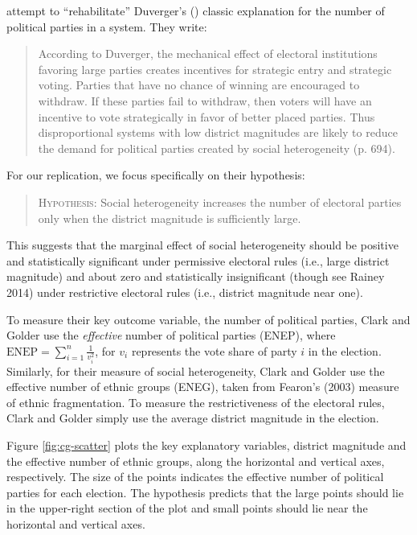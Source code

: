 \documentclass[12pt]{article}
\begin{document}
\cite{ClarkGolder2006} attempt to ``rehabilitate'' Duverger's (\citeyear{Duverger1963}) classic explanation for the number of political parties in a system.
They write: 

\begin{quote}
According to Duverger, the mechanical effect of electoral institutions favoring large parties creates incentives for strategic entry and strategic voting. 
Parties that have no chance of winning are encouraged to withdraw. 
If these parties fail to withdraw, then voters will have an incentive to vote strategically in favor of better placed parties. 
Thus disproportional systems with low district magnitudes are likely to reduce the demand for political parties created by social heterogeneity (p. 694).
\end{quote}

For our replication, we focus specifically on their hypothesis:
\begin{quote}
\textsc{Hypothesis:} Social heterogeneity increases the number of electoral parties only when the district magnitude is sufficiently large.
\end{quote}

This suggests that the marginal effect of social heterogeneity should be positive and statistically significant under permissive electoral rules (i.e., large district magnitude) and about zero and statistically insignificant (though see Rainey 2014) under restrictive electoral rules (i.e., district magnitude near one).

To measure their key outcome variable, the number of political parties, Clark and Golder use the \textit{effective} number of political parties (ENEP), where $\text{ENEP} = \sum_{i = 1}^n\frac{1}{v_i^2}$, for $v_i$ represents the vote share of party $i$ in the election. 
Similarly, for their measure of social heterogeneity, Clark and Golder use the effective number of ethnic groups (ENEG), taken from Fearon's (2003) measure of ethnic fragmentation. 
To measure the restrictiveness of the electoral rules, Clark and Golder simply use the average district magnitude in the election. 

Figure \ref{fig:cg-scatter} plots the key explanatory variables, district magnitude and the effective number of ethnic groups, along the horizontal and vertical axes, respectively. 
The size of the points indicates the effective number of political parties for each election. 
The hypothesis predicts that the large points should lie in the upper-right section of the plot and small points should lie near the horizontal and vertical axes.
\end{document}
